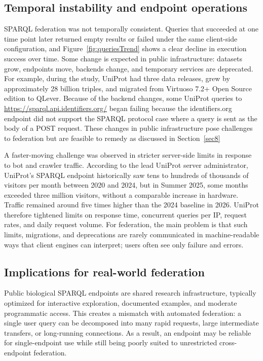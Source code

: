 \documentclass[runningheads]{llncs}
\begin{document}
\subsection{Temporal instability and endpoint operations}\label{sec6.2}
SPARQL federation was not temporally consistent. 
Queries that succeeded at one time point later returned empty results or failed under the same client-side configuration, and Figure~\ref{fig:queriesTrend} shows a clear decline in execution success over time. 
Some change is expected in public infrastructure: datasets grow, endpoints move, backends change, and temporary services are deprecated. 
For example, during the study, UniProt had three data releases, grew by approximately 28 billion triples, and migrated from Virtuoso 7.2+ Open Source edition to QLever. 
Because of the backend changes, some UniProt queries to \url{https://sparql.api.identifiers.org/} began failing because the identifiers.org endpoint did not support the SPARQL protocol case where a query is sent as the body of a POST request.
These changes in public infrastructure pose challenges to federation but are feasible to remedy as discussed in Section~\ref{sec8}

A faster-moving challenge was observed in stricter server-side limits in response to bot and crawler traffic. 
According to the lead UniProt server administrator, UniProt's SPARQL endpoint historically saw tens to hundreds of thousands of visitors per month between 2020 and 2024, but in Summer 2025, some months exceeded three million visitors, without a comparable increase in hardware. 
Traffic remained around five times higher than the 2024 baseline in 2026. 
UniProt therefore tightened limits on response time, concurrent queries per IP, request rates, and daily request volume. 
For federation, the main problem is that such limits, migrations, and deprecations are rarely communicated in machine-readable ways that client engines can interpret; users often see only failure and errors.

\subsection{Implications for real-world federation}\label{sec6.3}

Public biological SPARQL endpoints are shared research infrastructure, typically optimized for interactive exploration, documented examples, and moderate programmatic access. 
This creates a mismatch with automated federation: a single user query can be decomposed into many rapid requests, large intermediate transfers, or long-running connections. 
As a result, an endpoint may be reliable for single-endpoint use while still being poorly suited to unrestricted cross-endpoint federation.
\end{document}
